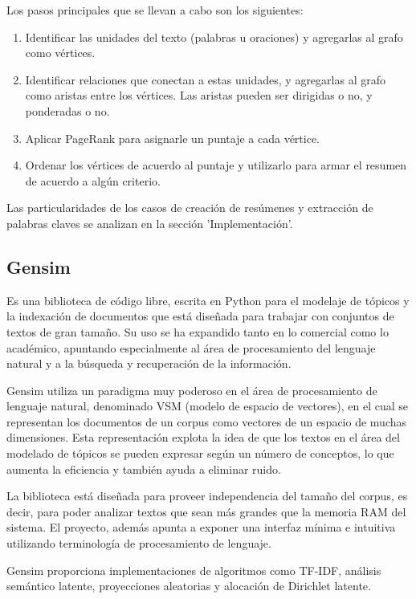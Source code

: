 \documentclass[a4paper]{article}
\begin{document}
Los pasos principales que se llevan a cabo son los siguientes:

\begin{enumerate}
\item Identificar las unidades del texto (palabras u oraciones) y agregarlas al grafo como vértices.
\item Identificar relaciones que conectan a estas unidades, y agregarlas al grafo como aristas entre los vértices. Las aristas pueden ser dirigidas o no, y ponderadas o no.
\item Aplicar PageRank para asignarle un puntaje a cada vértice.
\item Ordenar los vértices de acuerdo al puntaje y utilizarlo para armar el resumen de acuerdo a algún criterio.
\end{enumerate}

Las particularidades de los casos de creación de resúmenes y extracción de palabras claves se analizan en la sección 'Implementación'.


\subsection{Gensim}
Es una biblioteca de código libre, escrita en Python para el modelaje de tópicos y la indexación de documentos que está diseñada para trabajar con conjuntos de textos de gran tamaño. Su uso se ha expandido tanto en lo comercial como lo académico, apuntando especialmente al área de procesamiento del lenguaje natural y a la búsqueda y recuperación de la información.

Gensim utiliza un paradigma muy poderoso en el área de procesamiento de lenguaje natural, denominado VSM (modelo de espacio de vectores), en el cual se representan los documentos de un corpus como vectores de un espacio de muchas dimensiones. Esta representación explota la idea de que los textos en el área del modelado de tópicos se pueden expresar según un número de conceptos, lo que aumenta la eficiencia y también ayuda a eliminar ruido.

La biblioteca está diseñada para proveer independencia del tamaño del corpus, es decir, para poder analizar textos que sean más grandes que la memoria RAM del sistema. El proyecto, además apunta a exponer una interfaz mínima e intuitiva utilizando terminología de procesamiento de lenguaje.

Gensim proporciona implementaciones de algoritmos como TF-IDF, análisis semántico latente, proyecciones aleatorias y alocación de Dirichlet latente.
\end{document}
